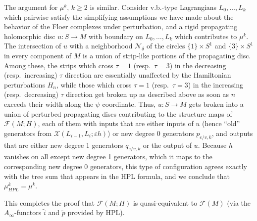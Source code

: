 \documentclass[11pt,leqno]{amsart}
\numberwithin{equation}{section}
\newcommand{\cF}{{\mathcal F}}
\newcommand{\cN}{{\mathcal N}}
\newcommand{\cX}{{\mathcal X}}
\begin{document}
The argument for $\mu^k$, $k\geq 2$ is similar. Consider v.b.-type
Lagrangians $L_0,\dots,L_k$ which pairwise satisfy the simplifying
assumptions we have made about the behavior of the Floer complexes under
perturbation, and a rigid propagating holomorphic disc $u:S\to M$ with
boundary on $L_0,\dots,L_k$ which contributes to $\mu^k$. The intersection
of $u$ with a neighborhood $\cN_\delta$ of the circles $\{1\}\times S^1$ and
$\{3\}\times S^1$ in every component of $M$ is a union of strip-like
portions of the propagating disc. Among these, the strips which cross $\tau=1$
(resp.\ $\tau=3$) in the decreasing (resp.\ increasing) $\tau$ direction
are essentially unaffected by the Hamiltonian perturbations $H_n$, while
those which cross $\tau=1$ (resp.\ $\tau=3$) in the increasing (resp.\
decreasing) $\tau$ direction get broken up as described above as soon
as $n$ exceeds their width along the $\psi$ coordinate.
Thus, $u:S\to M$ gets broken into a union of perturbed
propagating discs contributing to the structure maps of $\cF(M;H)$, each of
them with inputs that are either inputs of $u$ (hence ``old'' generators from $\cX(L_{i-1},L_i;\varepsilon
h)$) or new degree $0$ generators $p_{e/v,k}$, and outputs that are either new degree 1
generators $q_{e/v,k}$ or the output of $u$. Because $h$ vanishes on all except new
degree 1 generators, which it maps to the corresponding new degree 0
generators, this type of configuration agrees exactly with the 
tree sum that appears in the HPL formula, and we conclude that
$\mu^k_{HPL}=\mu^k$.

This completes the proof that $\cF(M;H)$ is quasi-equivalent to $\cF(M)$
(via the $A_\infty$-functors $\tilde{i}$ and $\tilde{p}$ provided by HPL).
\end{document}
